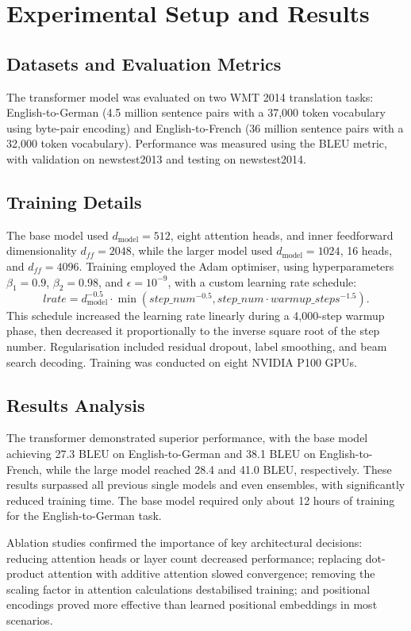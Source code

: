 \section{Experimental Setup and Results}

\subsection{Datasets and Evaluation Metrics}

The transformer model was evaluated on two WMT 2014 translation tasks: English-to-German (4.5 million sentence pairs with a 37,000 token vocabulary using byte-pair encoding) and English-to-French (36 million sentence pairs with a 32,000 token vocabulary). Performance was measured using the BLEU metric, with validation on newstest2013 and testing on newstest2014.

\subsection{Training Details}

The base model used $d_\text{model}=512$, eight attention heads, and inner feedforward dimensionality $d_{ff}=2048$, while the larger model used $d_\text{model}=1024$, 16 heads, and $d_{ff}=4096$. Training employed the Adam optimiser, using hyperparameters $\beta_1=0.9$, $\beta_2=0.98$, and $\epsilon=10^{-9}$, with a custom learning rate schedule:
\begin{equation}
  lrate=d_\text{model}^{-0.5}\cdot\min(step\_num^{-0.5},step\_num \cdot warmup\_steps^{-1.5}).
\end{equation}\label{eq:lrate}
This schedule increased the learning rate linearly during a 4,000-step warmup phase, then decreased it proportionally to the inverse square root of the step number. Regularisation included residual dropout, label smoothing, and beam search decoding. Training was conducted on eight NVIDIA P100 GPUs.

\subsection{Results Analysis}

The transformer demonstrated superior performance, with the base model achieving 27.3 BLEU on English-to-German and 38.1 BLEU on English-to-French, while the large model reached 28.4 and 41.0 BLEU, respectively. These results surpassed all previous single models and even ensembles, with significantly reduced training time. The base model required only about 12 hours of training for the English-to-German task.

Ablation studies confirmed the importance of key architectural decisions: reducing attention heads or layer count decreased performance; replacing dot-product attention with additive attention slowed convergence; removing the scaling factor in attention calculations destabilised training; and positional encodings proved more effective than learned positional embeddings in most scenarios.
